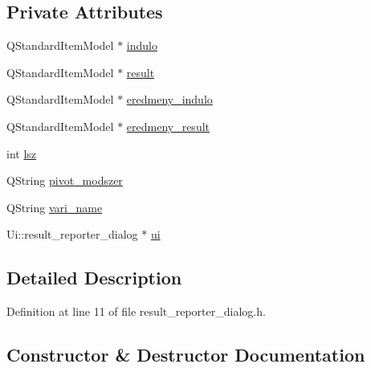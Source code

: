 \subsection*{Private Attributes}
\begin{DoxyCompactItemize}
\item 
Q\+Standard\+Item\+Model $\ast$ \hyperlink{classresult__reporter__dialog_a0eb2cb5e19889d1cfac2a1d646881f4a}{indulo}
\item 
Q\+Standard\+Item\+Model $\ast$ \hyperlink{classresult__reporter__dialog_abec7c912a4cada9f1468fa797891cf03}{result}
\item 
Q\+Standard\+Item\+Model $\ast$ \hyperlink{classresult__reporter__dialog_a2a1877d557a819d4a2553b72938ab915}{eredmeny\+\_\+indulo}
\item 
Q\+Standard\+Item\+Model $\ast$ \hyperlink{classresult__reporter__dialog_a934fd151454fd702de318ca65acf61c9}{eredmeny\+\_\+result}
\item 
int \hyperlink{classresult__reporter__dialog_a913f9df7c2d4b76ac45c82d6540d8318}{lsz}
\item 
Q\+String \hyperlink{classresult__reporter__dialog_af5ebf610d22060e37051b13b6a830555}{pivot\+\_\+modszer}
\item 
Q\+String \hyperlink{classresult__reporter__dialog_a9e9486d712fcf04bba7dc075c884ef2d}{vari\+\_\+name}
\item 
Ui\+::result\+\_\+reporter\+\_\+dialog $\ast$ \hyperlink{classresult__reporter__dialog_a39c7aed3c9e33fecef625ef148e529c1}{ui}
\end{DoxyCompactItemize}


\subsection{Detailed Description}


Definition at line 11 of file result\+\_\+reporter\+\_\+dialog.\+h.



\subsection{Constructor \& Destructor Documentation}
\mbox{\label{classresult__reporter__dialog_ad6b12890998c80ec5f69ee28ad28e533}} 
